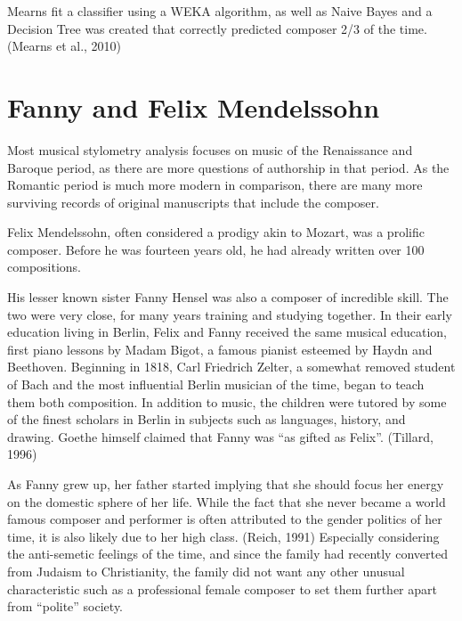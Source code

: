 \documentclass[12pt,twoside]{reedthesis}
\theoremstyle{definition}
\theoremstyle{definition}
\theoremstyle{definition}
\theoremstyle{remark}
\begin{document}
Mearns fit a classifier using a WEKA algorithm, as well as Naive Bayes
and a Decision Tree was created that correctly predicted composer 2/3 of
the time. (Mearns et al., 2010)

\section{Fanny and Felix Mendelssohn}\label{fanny-and-felix-mendelssohn}

Most musical stylometry analysis focuses on music of the Renaissance and
Baroque period, as there are more questions of authorship in that
period. As the Romantic period is much more modern in comparison, there
are many more surviving records of original manuscripts that include the
composer.

Felix Mendelssohn, often considered a prodigy akin to Mozart, was a
prolific composer. Before he was fourteen years old, he had already
written over 100 compositions.

His lesser known sister Fanny Hensel was also a composer of incredible
skill. The two were very close, for many years training and studying
together. In their early education living in Berlin, Felix and Fanny
received the same musical education, first piano lessons by Madam Bigot,
a famous pianist esteemed by Haydn and Beethoven. Beginning in 1818,
Carl Friedrich Zelter, a somewhat removed student of Bach and the most
influential Berlin musician of the time, began to teach them both
composition. In addition to music, the children were tutored by some of
the finest scholars in Berlin in subjects such as languages, history,
and drawing. Goethe himself claimed that Fanny was ``as gifted as
Felix''. (Tillard, 1996)

As Fanny grew up, her father started implying that she should focus her
energy on the domestic sphere of her life. While the fact that she never
became a world famous composer and performer is often attributed to the
gender politics of her time, it is also likely due to her high class.
(Reich, 1991) Especially considering the anti-semetic feelings of the
time, and since the family had recently converted from Judaism to
Christianity, the family did not want any other unusual characteristic
such as a professional female composer to set them further apart from
``polite'' society.
\end{document}

